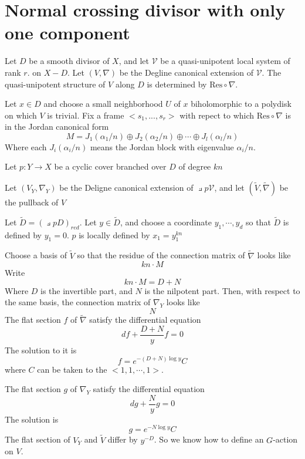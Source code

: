 \documentclass{article}
\begin{document}
\section{Normal crossing divisor with only one component}
\newcommand{\V}{\mathcal{V}}
Let $D$ be a smooth divisor of $X$, and let $\V$ be a quasi-unipotent local system of rank $r$.
on $X - D$. Let $(V, \nabla)$ be the Degline canonical extension of $\V$. 
The quasi-unipotent structure of $V$ along $D$ is determined by $\text{Res}\circ\nabla$.

Let $x \in D$ and choose a small neighborhood $U$ of $x$ biholomorphic to a polydisk on
which $V$ is trivial. Fix a frame $<s_1,...,s_r>$ with repect to which $\text{Res}\circ\nabla$
is in the Jordan canonical form
\[
   M =  J_1(\alpha_1/n)\oplus J_2(\alpha_2/n)\oplus\cdots\oplus J_l(\alpha_l/n)
\]
Where each $J_i(\alpha_i/n)$ means the Jordan block with eigenvalue $\alpha_i/n$.

Let $p: Y \rightarrow X$ be a cyclic cover branched over $D$ of degree $kn$

Let $(V_Y, \nabla_Y)$ be the Deligne canonical extension of $\pullback{p}\V$, 
and let $(\tilde{V}, \tilde{\nabla})$ be the pullback of $V$


\newcommand{\tD}{\tilde{D}}
Let $\tD = (\pullback{p}D)_{red}$. Let $y \in \tD$, and choose a coordinate $y_1,\cdots, y_d$
so that $\tD$ is defined by $y_1 = 0$. $p$ is locally defined by $x_1 = y_1^{kn}$
 
Choose a basis of $\tilde{V}$ so that the residue of the connection matrix of $\tilde{\nabla}$ looks like
\[
    kn \cdot M
\]
Write
\[
    kn\cdot M = D + N
\]
Where $D$ is the invertible part, and $N$ is the nilpotent part. 
Then, with respect to the same basis, the connection matrix of $\nabla_Y$ looks like
\[
    N
\]
The flat section $f$ of $\tilde{\nabla}$ satisfy the differential equation
\[
    df + \frac{D+N}{y}f = 0
\]
The solution to it is
\[
    f = e^{-(D+N)\log y}C
\]
where $C$ can be taken to the $<1,1,\cdots,1>$. 

The flat section $g$ of $\nabla_Y$ satisfy the differential equation
\[
    dg + \frac{N}{y}g = 0
\]
The solution is 
\[
    g = e^{-N\log y}C
\]
The flat section of $V_Y$ and $\tilde{V}$ differ by $y^{-D}$. So we know how to define an $G$-action
on $V$.
\end{document}
